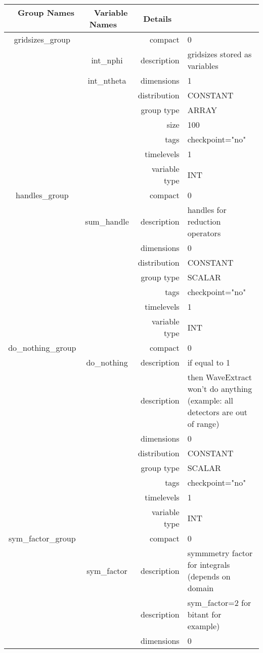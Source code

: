 \documentclass{article}
\begin{document}
\begin{tabular*}{150mm}{|c|c@{\extracolsep{\fill}}|rl|} \hline 
~ {\bf Group Names} ~ & ~ {\bf Variable Names} ~  &{\bf Details} ~ & ~\\ 
\hline 
gridsizes\_group &  & compact & 0 \\ 
 & int\_nphi & description & gridsizes stored as variables \\ 
 & int\_ntheta & dimensions & 1 \\ 
 &  & distribution & CONSTANT \\ 
 &  & group type & ARRAY \\ 
 &  & size & 100 \\ 
 &  & tags & checkpoint="no" \\ 
 &  & timelevels & 1 \\ 
 &  & variable type & INT \\ 
\hline 
handles\_group &  & compact & 0 \\ 
 & sum\_handle & description & handles for reduction operators \\ 
 &  & dimensions & 0 \\ 
 &  & distribution & CONSTANT \\ 
 &  & group type & SCALAR \\ 
 &  & tags & checkpoint="no" \\ 
 &  & timelevels & 1 \\ 
 &  & variable type & INT \\ 
\hline 
do\_nothing\_group &  & compact & 0 \\ 
 & do\_nothing & description & if equal to 1 \\ 
& ~ & description &  then WaveExtract won't do anything (example: all detectors are out of range) \\ 
 &  & dimensions & 0 \\ 
 &  & distribution & CONSTANT \\ 
 &  & group type & SCALAR \\ 
 &  & tags & checkpoint="no" \\ 
 &  & timelevels & 1 \\ 
 &  & variable type & INT \\ 
\hline 
sym\_factor\_group &  & compact & 0 \\ 
 & sym\_factor & description & symmmetry factor for integrals (depends on domain \\ 
& ~ & description &  sym\_factor=2 for bitant for example) \\ 
 &  & dimensions & 0 \\ 

\end{tabular*}
\end{document}
